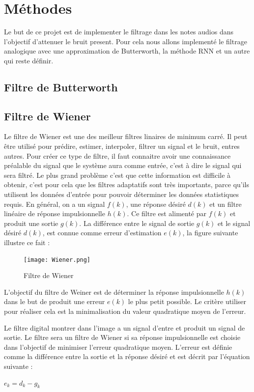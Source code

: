 \documentclass[conference,onecolumn]{IEEEtran}
\begin{document}
\clearpage
\section{Méthodes}
Le but de ce projet est de implementer le filtrage dans les notes audios dans l'objectif d'attenuer le bruit present. Pour cela nous allons implementé le filtrage analogique avec une approximation de Butterworth, la méthode RNN et un autre qui reste définir.

\subsection{\textbf{Filtre de Butterworth}}

\subsection{\textbf{Filtre de Wiener}}
Le filtre de Wiener est une des meilleur filtres linaires de minimum carré. Il peut être utilisé pour prédire, estimer, interpoler, filtrer un signal et le bruit, entres autres. Pour créer ce type de filtre, il faut connaitre avoir une connaissance préalable du signal que le système aura comme entrée, c’est à dire le signal qui sera filtré. Le plus grand problème c’est que cette information est difficile à obtenir, c’est pour cela que les filtres adaptatifs sont très importants, parce qu’ils utilisent les données d’entrée pour pouvoir déterminer les données statistiques requis. En général, on a un signal $f(k)$, une réponse désiré $d(k)$ et un filtre linéaire de réponse impulsionnelle $h(k)$. Ce filtre est alimenté par $f(k)$ et produit une sortie $g(k)$. La différence entre le signal de sortie $g(k)$ et le signal désiré $d(k)$, est connue comme erreur d’estimation $e(k)$, la figure suivante illustre ce fait :


\begin{figure}[H]
 \centering
    \texttt{[image: Wiener.png]}
    \caption{Filtre de Wiener}
\end{figure}

L’objectif du filtre de Weiner est de déterminer la réponse impulsionnelle $h(k)$ dans le but de produit une erreur $e(k)$ le plus petit possible. Le critère utiliser pour réaliser cela est la minimalisation du valeur quadratique moyen de l’erreur.

Le filtre digital montrer dans l’image a un signal d’entre et produit un signal de sortie. Le filtre sera un filtre de Wiener si sa réponse impulsionnelle est choisie dans l’objectif de minimiser l’erreur quadratique moyen. L’erreur est définie comme la différence entre la sortie et la réponse désiré et est décrit par l’équation suivante :
\begin{center}
     $e_k=d_k-g_k$
\end{center}{}
\end{document}
